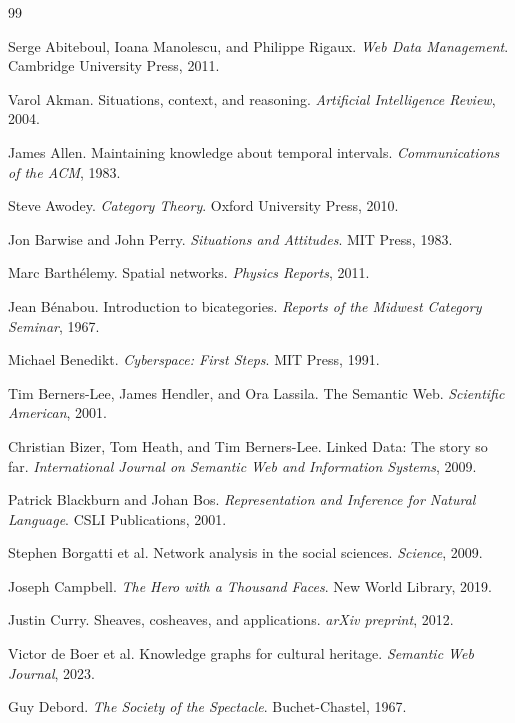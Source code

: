 \documentclass[12pt,a4paper]{article}
\begin{document}
\newpage
\begin{thebibliography}{99}

Serge Abiteboul, Ioana Manolescu, and Philippe Rigaux.
\textit{Web Data Management}.
Cambridge University Press, 2011.

Varol Akman.
Situations, context, and reasoning.
\textit{Artificial Intelligence Review}, 2004.

James Allen.
Maintaining knowledge about temporal intervals.
\textit{Communications of the ACM}, 1983.

Steve Awodey.
\textit{Category Theory}.
Oxford University Press, 2010.

Jon Barwise and John Perry.
\textit{Situations and Attitudes}.
MIT Press, 1983.

Marc Barthélemy.
Spatial networks.
\textit{Physics Reports}, 2011.

Jean Bénabou.
Introduction to bicategories.
\textit{Reports of the Midwest Category Seminar}, 1967.

Michael Benedikt.
\textit{Cyberspace: First Steps}.
MIT Press, 1991.

Tim Berners-Lee, James Hendler, and Ora Lassila.
The Semantic Web.
\textit{Scientific American}, 2001.

Christian Bizer, Tom Heath, and Tim Berners-Lee.
Linked Data: The story so far.
\textit{International Journal on Semantic Web and Information Systems}, 2009.

Patrick Blackburn and Johan Bos.
\textit{Representation and Inference for Natural Language}.
CSLI Publications, 2001.

Stephen Borgatti et al.
Network analysis in the social sciences.
\textit{Science}, 2009.

Joseph Campbell.
\textit{The Hero with a Thousand Faces}.
New World Library, 2019.

Justin Curry.
Sheaves, cosheaves, and applications.
\textit{arXiv preprint}, 2012.

Victor de Boer et al.
Knowledge graphs for cultural heritage.
\textit{Semantic Web Journal}, 2023.

Guy Debord.
\textit{The Society of the Spectacle}.
Buchet-Chastel, 1967.


\end{thebibliography}
\end{document}
